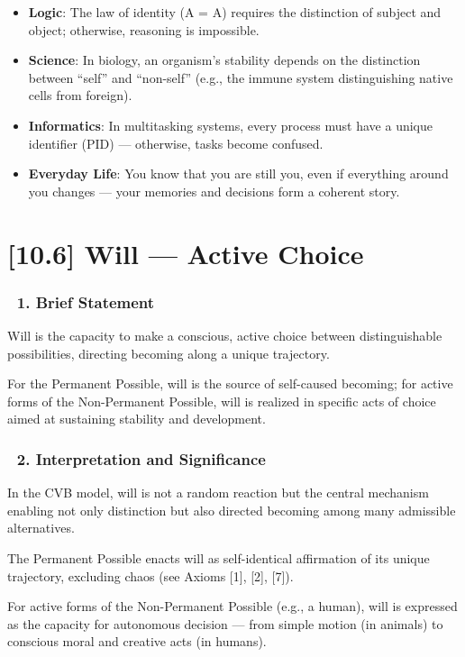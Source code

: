 \documentclass[12pt]{article}
\begin{document}
\begin{itemize}
\item \textbf{Logic}: The law of identity (A = A) requires the distinction of subject and object; otherwise, reasoning is impossible.
\item \textbf{Science}: In biology, an organism’s stability depends on the distinction between ``self'' and ``non-self'' (e.g., the immune system distinguishing native cells from foreign).
\item \textbf{Informatics}: In multitasking systems, every process must have a unique identifier (PID) — otherwise, tasks become confused.
\item \textbf{Everyday Life}: You know that you are still you, even if everything around you changes — your memories and decisions form a coherent story.
\end{itemize}


\section*{[10.6] Will — Active Choice}

\subsubsection*{🔹 1. Brief Statement}

Will is the capacity to make a conscious, active choice between distinguishable possibilities, directing becoming along a unique trajectory.

For the Permanent Possible, will is the source of self-caused becoming; for active forms of the Non-Permanent Possible, will is realized in specific acts of choice aimed at sustaining stability and development.

\subsubsection*{🔹 2. Interpretation and Significance}

In the CVB model, will is not a random reaction but the central mechanism enabling not only distinction but also directed becoming among many admissible alternatives.

The Permanent Possible enacts will as self-identical affirmation of its unique trajectory, excluding chaos (see Axioms [1], [2], [7]).

For active forms of the Non-Permanent Possible (e.g., a human), will is expressed as the capacity for autonomous decision — from simple motion (in animals) to conscious moral and creative acts (in humans).
\end{document}
